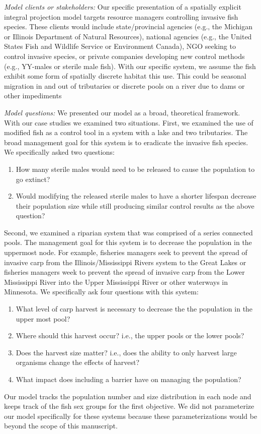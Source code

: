 \documentclass{article}[12pt]
\begin{document}
\textit{Model clients or stakeholders:}
Our specific presentation of a spatially explicit integral projection model targets resource managers controlling invasive fish species.
These clients would include state/provincial agencies (e.g., the Michigan or Illinois Department of Natural Resources), national agencies (e.g., the United States Fish and Wildlife Service or Environment Canada), NGO seeking to control invasive species, or private companies developing new control methods (e.g., YY-males or sterile male fish). 
With our specific system, we assume the fish exhibit some form of spatially discrete habitat this use.
This could be seasonal migration in and out of tributaries or discrete pools on a river due to dams or other impediments 

\textit{Model questions:}
We presented our model as a broad, theoretical framework. 
With our case studies we examined two situations.
First, we examined the use of modified fish as a control tool in a system with a lake and two tributaries.
The broad management goal for this system is to eradicate the invasive fish species. 
We specifically asked two questions:
\begin{enumerate}
\item How many sterile males would need to be released to cause the population to go extinct?
\item Would modifying the released sterile males to have a shorter lifespan decrease their population size while still producing similar control results as the above question? 
\end{enumerate}
Second, we examined a riparian system that was comprised of a series connected pools.
The management goal for this system is to decrease the population in the uppermost node.
For example, fisheries managers seek to prevent the spread of invasive carp from the Illinois/Mississippi Rivers system to the Great Lakes or fisheries managers week to prevent the spread of invasive carp from the Lower Mississippi River into the Upper Mississippi River or other waterways in Minnesota.
We specifically ask four questions with this system:
\begin{enumerate}
\item What level of carp harvest is necessary to decrease the the population in the upper most pool?
\item Where should this harvest occur? i.e., the upper pools or the lower pools? 
\item Does the harvest size matter? i.e., does the ability to only harvest large organisms change the effects of harvest? 
\item What impact does including a barrier have on managing the population? 
\end{enumerate}
Our model tracks the population number and size distribution in each node and keeps track of the fish sex groups for the first objective.  
We did not parameterize our model specifically for these systems because these parameterizations would be beyond the scope of this manuscript. 
\end{document}
